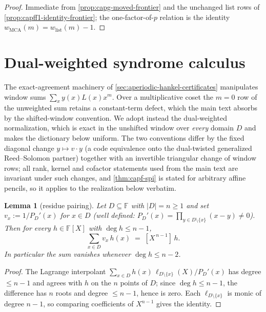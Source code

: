 \documentclass[11pt]{article}
\newtheorem{lemma}[lemma]{Lemma}
\theoremstyle{definition}
\theoremstyle{remark}
\newcommand{\F}{\mathbb{F}}
\begin{document}
\begin{proof}
Immediate from \cref{prop:capg-moved-frontier} and the unchanged list rows
of \cref{prop:capff1-identity-frontier}; the one-factor-of-$p$ relation is
the identity $w_{\mathrm{MCA}}(m)=w_{\mathrm{list}}(m)-1$.
\end{proof}

\section{Dual-weighted syndrome calculus}\label{sec:capg-calculus}

The exact-agreement machinery of
\cref{sec:aperiodic-hankel-certificates} manipulates window sums
$\sum_x y(x)L(x)x^m$.  Over a multiplicative coset the $m=0$ row of the
unweighted sum retains a constant-term defect, which the main text absorbs
by the shifted-window convention.  We adopt instead the dual-weighted
normalization, which is exact in the unshifted window over \emph{every}
domain $D$ and makes the dictionary below uniform.  The two conventions
differ by the fixed diagonal change $y\mapsto v\cdot y$ (a code equivalence
onto the dual-twisted generalized Reed--Solomon partner) together with an
invertible triangular change of window rows; all rank, kernel and cofactor
statements used from the main text are invariant under such changes, and
\cref{thm:capf-spi} is stated for arbitrary affine pencils, so it applies to
the realization below verbatim.

\begin{lemma}[residue pairing]\label{lem:capg-residue}
Let $D\subseteq\F$ with $|D|=n\geq 1$ and set $v_x:=1/P_D'(x)$ for $x\in D$
(well defined: $P_D'(x)=\prod_{y\in D\setminus\{x\}}(x-y)\neq 0$).  Then for
every $h\in\F[X]$ with $\deg h\leq n-1$,
\[
\sum_{x\in D} v_x\,h(x) \;=\; [X^{\,n-1}]\,h .
\]
In particular the sum vanishes whenever $\deg h\leq n-2$.
\end{lemma}

\begin{proof}
The Lagrange interpolant
$\sum_{x\in D}h(x)\,\ell_{D\setminus\{x\}}(X)/P_D'(x)$ has degree
$\leq n-1$ and agrees with $h$ on the $n$ points of $D$; since
$\deg h\leq n-1$, the difference has $n$ roots and degree $\leq n-1$, hence
is zero.  Each $\ell_{D\setminus\{x\}}$ is monic of degree $n-1$, so
comparing coefficients of $X^{n-1}$ gives the identity.
\end{proof}
\end{document}
